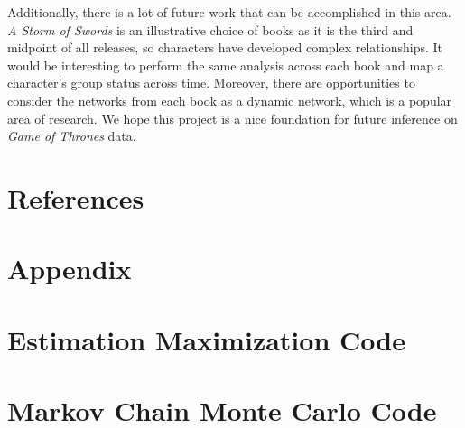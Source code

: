 \documentclass{article}
\begin{document}
Additionally, there is a lot of future work that can be accomplished in this area. \textit{A Storm of Swords} is an illustrative choice of books as it is the third and midpoint of all releases, so characters have developed complex relationships. It would be interesting to perform the same analysis across each book and map a character's group status across time. Moreover, there are opportunities to consider the networks from each book as a dynamic network, which is a popular area of research. We hope this project is a nice foundation for future inference on \textit{Game of Thrones} data.

\section{References}
\printbibliography

\section*{Appendix}
\appendix 

\section{Estimation Maximization Code}
\section{Markov Chain Monte Carlo Code}
\end{document}
